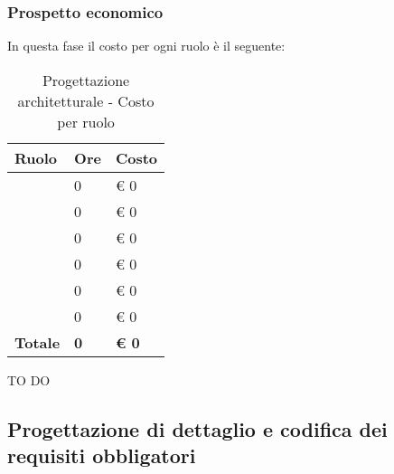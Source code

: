 		\subsubsection{Prospetto economico} %
		\label{ssub:prospetto_economico}
		In questa fase il costo per ogni ruolo è il seguente: \\
			\begin{table}[!h]
				\begin{center}
					\begin{tabularx}{0.6\textwidth}{|l|l|X|}
						\hline
						\textbf{Ruolo} & \textbf{Ore} & \textbf{Costo} \\
						\hline
						\roleProjectManager & 0 & \euro{} 0 \\
						\hline
						\roleAnalyst & 0 & \euro{} 0 \\
						\hline
						\roleDesigner & 0 & \euro{} 0 \\
						\hline
						\roleAdministrator & 0 & \euro{} 0 \\
						\hline
						\roleProgrammer & 0 & \euro{} 0 \\
						\hline
						\roleVerifier & 0 & \euro{} 0 \\
						\hline
						\textbf{Totale} & \textbf{0} & \textbf{\euro{} 0} \\
						\hline
					\end{tabularx}
				\end{center}
			\caption{Progettazione architetturale - Costo per ruolo}
			\end{table}
			
		\noindent
		TO DO	
		
	
	\subsection{Progettazione di dettaglio e codifica dei requisiti obbligatori} %
	\label{sub:progettazione_di_dettaglio_e_codifica_dei_requisiti_obbligatori}
